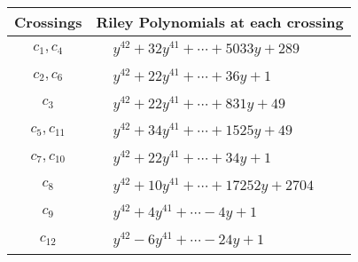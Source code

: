 \documentclass[1p]{elsarticle_modified}
\theoremstyle{definition}
\begin{document}
\begin{tabular}{m{50pt}|m{274pt}}
Crossings & \hspace{64pt}Riley Polynomials at each crossing \\
\hline $$\begin{aligned}c_{1},c_{4}\end{aligned}$$&$\begin{aligned}
&y^{42}+32 y^{41}+\cdots+5033 y+289
\end{aligned}$\\
\hline $$\begin{aligned}c_{2},c_{6}\end{aligned}$$&$\begin{aligned}
&y^{42}+22 y^{41}+\cdots+36 y+1
\end{aligned}$\\
\hline $$\begin{aligned}c_{3}\end{aligned}$$&$\begin{aligned}
&y^{42}+22 y^{41}+\cdots+831 y+49
\end{aligned}$\\
\hline $$\begin{aligned}c_{5},c_{11}\end{aligned}$$&$\begin{aligned}
&y^{42}+34 y^{41}+\cdots+1525 y+49
\end{aligned}$\\
\hline $$\begin{aligned}c_{7},c_{10}\end{aligned}$$&$\begin{aligned}
&y^{42}+22 y^{41}+\cdots+34 y+1
\end{aligned}$\\
\hline $$\begin{aligned}c_{8}\end{aligned}$$&$\begin{aligned}
&y^{42}+10 y^{41}+\cdots+17252 y+2704
\end{aligned}$\\
\hline $$\begin{aligned}c_{9}\end{aligned}$$&$\begin{aligned}
&y^{42}+4 y^{41}+\cdots-4 y+1
\end{aligned}$\\
\hline $$\begin{aligned}c_{12}\end{aligned}$$&$\begin{aligned}
&y^{42}-6 y^{41}+\cdots-24 y+1
\end{aligned}$\\
\hline
\end{tabular}\\~\\
\end{document}
